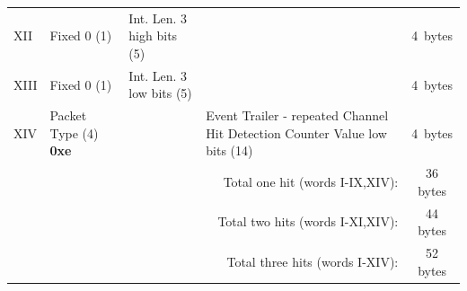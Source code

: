 \documentclass[letterpaper,12pt,notitlepage]{report}
\begin{document}
\begin{landscape}
\begin{table}
\begin{tabular*}{\textwidth}{p{0.9cm}|p{2.25cm}|p{2.2cm}|p{2.2cm}|p{2.2cm}|p{2.2cm}|p{2.2cm}|p{2.2cm}|p{2.2cm}|c}
\cline{2-9}
XII & Fixed 0 (1) & Int. Len. 3 high bits (5) & \multicolumn{6}{p{13.2cm}|}{\centering{Pulse Height 3 (26)}} & 4~bytes\\
\cline{2-9}
XIII & Fixed 0 (1) & Int. Len. 3 low bits (5) & \multicolumn{6}{p{13.2cm}|}{\centering{CFD 3 (26)}} & 4~bytes\\
\cline{2-9}
XIV & Packet Type (4) {\bf 0xe} & \multicolumn{3}{p{6.6cm}|}{\centering{reserved (14)}} & \multicolumn{4}{p{8.8cm}|}{Event Trailer - repeated Channel Hit Detection Counter Value low bits (14)} & 4~bytes\\
\cline{2-9}
\multicolumn{9}{r}{Total one hit (words I-IX,XIV):} & 36 bytes\\
\multicolumn{9}{r}{Total two hits (words I-XI,XIV):} & 44 bytes\\
\multicolumn{9}{r}{Total three hits (words I-XIV):} & 52 bytes\\
\end{tabular*}
\end{table}
\end{landscape}
\end{document}

